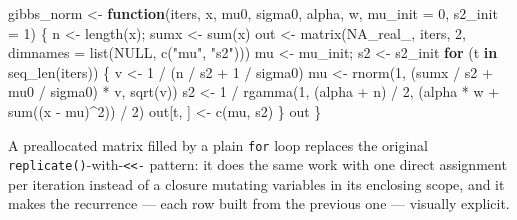 \documentclass[
  letterpaper,
  DIV=11,
  numbers=noendperiod]{scrreprt}
\newenvironment{Shaded}{\begin{snugshade}}{\end{snugshade}}
\newcommand{\AttributeTok}[1]{\textcolor[rgb]{0.40,0.45,0.13}{#1}}
\newcommand{\ConstantTok}[1]{\textcolor[rgb]{0.56,0.35,0.01}{#1}}
\newcommand{\ControlFlowTok}[1]{\textcolor[rgb]{0.00,0.23,0.31}{\textbf{#1}}}
\newcommand{\DecValTok}[1]{\textcolor[rgb]{0.68,0.00,0.00}{#1}}
\newcommand{\FunctionTok}[1]{\textcolor[rgb]{0.28,0.35,0.67}{#1}}
\newcommand{\NormalTok}[1]{\textcolor[rgb]{0.00,0.23,0.31}{#1}}
\newcommand{\OtherTok}[1]{\textcolor[rgb]{0.00,0.23,0.31}{#1}}
\newcommand{\SpecialCharTok}[1]{\textcolor[rgb]{0.37,0.37,0.37}{#1}}
\newcommand{\StringTok}[1]{\textcolor[rgb]{0.13,0.47,0.30}{#1}}
\begin{document}
\begin{Shaded}
\begin{Highlighting}[]
\NormalTok{gibbs\_norm }\OtherTok{\textless{}{-}} \ControlFlowTok{function}\NormalTok{(iters, x, mu0, sigma0, alpha, w, }\AttributeTok{mu\_init =} \DecValTok{0}\NormalTok{, }\AttributeTok{s2\_init =} \DecValTok{1}\NormalTok{) \{}
\NormalTok{    n }\OtherTok{\textless{}{-}} \FunctionTok{length}\NormalTok{(x); sumx }\OtherTok{\textless{}{-}} \FunctionTok{sum}\NormalTok{(x)}
\NormalTok{    out }\OtherTok{\textless{}{-}} \FunctionTok{matrix}\NormalTok{(}\ConstantTok{NA\_real\_}\NormalTok{, iters, }\DecValTok{2}\NormalTok{, }\AttributeTok{dimnames =} \FunctionTok{list}\NormalTok{(}\ConstantTok{NULL}\NormalTok{, }\FunctionTok{c}\NormalTok{(}\StringTok{"mu"}\NormalTok{, }\StringTok{"s2"}\NormalTok{)))}
\NormalTok{    mu }\OtherTok{\textless{}{-}}\NormalTok{ mu\_init; s2 }\OtherTok{\textless{}{-}}\NormalTok{ s2\_init}
    \ControlFlowTok{for}\NormalTok{ (t }\ControlFlowTok{in} \FunctionTok{seq\_len}\NormalTok{(iters)) \{}
\NormalTok{        v  }\OtherTok{\textless{}{-}} \DecValTok{1} \SpecialCharTok{/}\NormalTok{ (n }\SpecialCharTok{/}\NormalTok{ s2 }\SpecialCharTok{+} \DecValTok{1} \SpecialCharTok{/}\NormalTok{ sigma0)}
\NormalTok{        mu }\OtherTok{\textless{}{-}} \FunctionTok{rnorm}\NormalTok{(}\DecValTok{1}\NormalTok{, (sumx }\SpecialCharTok{/}\NormalTok{ s2 }\SpecialCharTok{+}\NormalTok{ mu0 }\SpecialCharTok{/}\NormalTok{ sigma0) }\SpecialCharTok{*}\NormalTok{ v, }\FunctionTok{sqrt}\NormalTok{(v))}
\NormalTok{        s2 }\OtherTok{\textless{}{-}} \DecValTok{1} \SpecialCharTok{/} \FunctionTok{rgamma}\NormalTok{(}\DecValTok{1}\NormalTok{, (alpha }\SpecialCharTok{+}\NormalTok{ n) }\SpecialCharTok{/} \DecValTok{2}\NormalTok{, (alpha }\SpecialCharTok{*}\NormalTok{ w }\SpecialCharTok{+} \FunctionTok{sum}\NormalTok{((x }\SpecialCharTok{{-}}\NormalTok{ mu)}\SpecialCharTok{\^{}}\DecValTok{2}\NormalTok{)) }\SpecialCharTok{/} \DecValTok{2}\NormalTok{)}
\NormalTok{        out[t, ] }\OtherTok{\textless{}{-}} \FunctionTok{c}\NormalTok{(mu, s2)}
\NormalTok{    \}}
\NormalTok{    out}
\NormalTok{\}}
\end{Highlighting}
\end{Shaded}

A preallocated matrix filled by a plain \texttt{for} loop replaces the
original \texttt{replicate()}-with-\texttt{\textless{}\textless{}-}
pattern: it does the same work with one direct assignment per iteration
instead of a closure mutating variables in its enclosing scope, and it
makes the recurrence --- each row built from the previous one ---
visually explicit.
\end{document}

